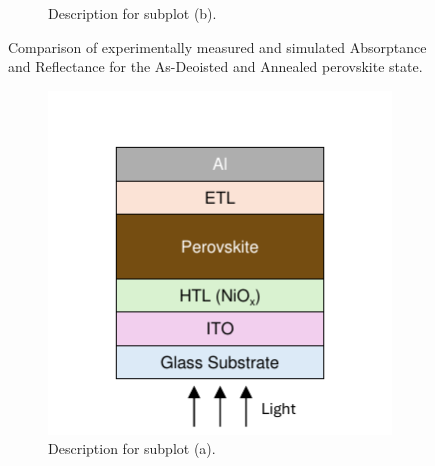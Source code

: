 \begin{figure}[htbp]
\begin{subfigure}[t]{0.49\textwidth}
        \caption{Description for subplot (b).}
        \label{fig:ch2:pix_substrate}
    \end{subfigure}

    \caption{Comparison of experimentally measured and simulated Absorptance and Reflectance for the As-Deoisted and Annealed perovskite state.}
    \label{fig:ch2:types_of_substrates}
\end{figure}

\begin{figure}[htbp]
    \centering
    \begin{subfigure}[t]{0.49\textwidth} %
        \centering
        \includegraphics[width=\textwidth]{chapters/material_properties/images/Glass_Stack.pdf} %
        \caption{Description for subplot (a).}
        \label{fig:ch2:glass_stack}
    \end{subfigure}
    \hfill %
    \begin{subfigure}[t]{0.49\textwidth} %
        \centering

\end{subfigure}
\end{figure}
